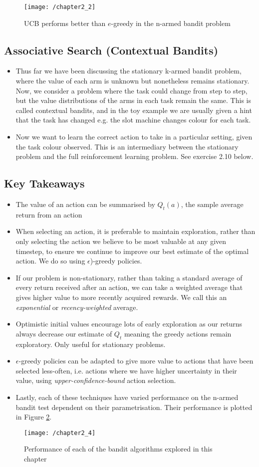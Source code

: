 \begin{figure}[h!]
	\centering
	\texttt{[image: /chapter2\_2]}
	\caption{UCB performs better than \(e\)-greedy in the n-armed bandit problem}
	\label{fig:chapter2_2}
\end{figure}

\subsection{Associative Search (Contextual Bandits)}
\begin{itemize}
\item Thus far we have been discussing the stationary k-armed bandit problem, where the value of each arm is unknown but nonetheless remains stationary. Now, we consider a problem where the task could change from step to step, but the value distributions of the arms in each task remain the same. This is called contextual bandits, and in the toy example we are usually given a hint that the task has changed e.g. the slot machine changes colour for each task.
\item Now we want to learn the correct action to take in a particular setting, given the task colour observed. This is an intermediary between the stationary problem and the full reinforcement learning problem. See exercise 2.10 below.
\end{itemize}

\subsection{Key Takeaways}
\begin{itemize}
\item The value of an action can be summarised by \(Q_t(a)\), the sample average return from an action
\item When selecting an action, it is preferable to maintain exploration, rather than only selecting the action we believe to be most valuable at any given timestep, to ensure we continue to improve our best estimate of the optimal action. We do so using \(\epsilon\))-greedy policies.
\item If our problem is non-stationary, rather than taking a standard average of every return received after an action, we can take a weighted average that gives higher value to more recently acquired rewards. We call this an \textit{exponential} or \textit{recency-weighted} average.
\item Optimistic initial values encourage lots of early exploration as our returns always decrease our estimate of \(Q_t\) meaning the greedy actions remain exploratory. Only useful for stationary problems.
\item \(\epsilon\)-greedy policies can be adapted to give more value to actions that have been selected less-often, i.e. actions where we have higher uncertainty in their value, using \textit{upper-confidence-bound} action selection.
\item Lastly, each of these techniques have varied performance on the n-armed bandit test dependent on their parametrisation. Their performance is plotted in Figure \ref{fig:chapter2_4}.
\end{itemize}

\begin{figure}[h!]
	\centering
	\texttt{[image: /chapter2\_4]}
	\caption{Performance of each of the bandit algorithms explored in this chapter}
	\label{fig:chapter2_4}
\end{figure}


